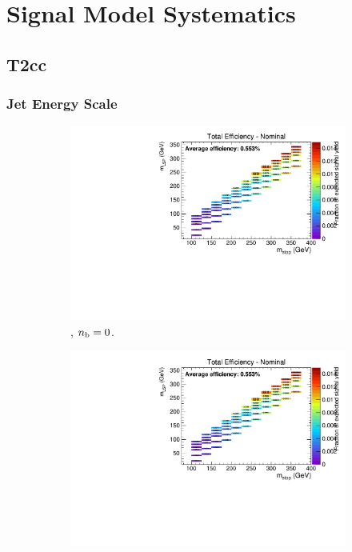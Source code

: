 \chapter{Signal Model Systematics}

\section*{T2cc}

\newpage
\subsection*{Jet Energy Scale}

\begin{figure}[ht!]
  \centering
  \begin{subfigure}[b]{0.32\textwidth}
    \includegraphics[width=\textwidth, page=4]{Figs/sms/t2cc/v24/JES_T2cc_v24_eq0b_le3j_incl.pdf}
    \caption{\njlow, $n_{\text{b}} = 0$.}
  \end{subfigure}
  \begin{subfigure}[b]{0.32\textwidth}
    \includegraphics[width=\textwidth, page=5]{Figs/sms/t2cc/v24/JES_T2cc_v24_eq0b_le3j_incl.pdf}

\end{subfigure}
\end{figure}
